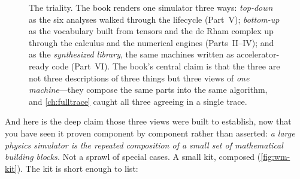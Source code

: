 \begin{figure}[t]
\centering
{}
\caption[The three views as one machine]{The triality. The book renders one
simulator three ways: \emph{top-down} as the six analyses walked through the lifecycle
(Part~V); \emph{bottom-up} as the vocabulary built from tensors and the de Rham complex
up through the calculus and the numerical engines (Parts~II--IV); and as the
\emph{synthesized library}, the same machines written as accelerator-ready code
(Part~VI). The book's central claim is that the three are not three descriptions of
three things but three views of \emph{one machine}---they compose the same parts into the
same algorithm, and \cref{ch:fulltrace} caught all three agreeing in a single trace.}
\label{fig:wm-triality}
\end{figure}

And here is the deep claim those three views were built to establish, now that you have
seen it proven component by component rather than asserted: \emph{a large physics
simulator is the repeated composition of a small set of mathematical building blocks.}
Not a sprawl of special cases. A small kit, composed (\cref{fig:wm-kit}). The kit is
short enough to list:

